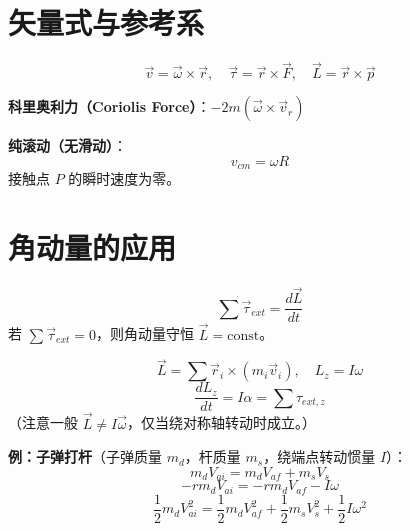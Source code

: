 \documentclass{article}
\begin{document}
\section{矢量式与参考系}

\begin{equation}
\vec{v} = \vec{\omega} \times \vec{r}, \quad \vec{\tau} = \vec{r} \times \vec{F}, \quad \vec{L} = \vec{r} \times \vec{p}
\end{equation}

\textbf{科里奥利力（Coriolis Force）}：\( -2m (\vec{\omega} \times \vec{v}_r) \)

\textbf{纯滚动（无滑动）}：
\begin{equation}
v_{cm} = \omega R
\end{equation}
接触点 \( P \) 的瞬时速度为零。

\begin{center}
\end{center}

\section{角动量的应用}

\begin{equation}
\sum \vec{\tau}_{ext} = \frac{d\vec{L}}{dt}
\end{equation}
若 \( \sum \vec{\tau}_{ext} = 0 \)，则角动量守恒 \( \vec{L} = \text{const} \)。

\begin{equation}
\vec{L} = \sum \vec{r}_i \times (m_i \vec{v}_i), \quad L_z = I\omega
\end{equation}
\begin{equation}
\frac{dL_z}{dt} = I\alpha = \sum \tau_{ext,z}
\end{equation}
（注意一般 \( \vec{L} \neq I\vec{\omega} \)，仅当绕对称轴转动时成立。）

\textbf{例：子弹打杆}（子弹质量 \( m_d \)，杆质量 \( m_s \)，绕端点转动惯量 \( I \)）：
\begin{equation}
m_d V_{ai} = m_d V_{af} + m_s V_{s}
\end{equation}
\begin{equation}
-r m_d V_{ai} = -r m_d V_{af} - I\omega
\end{equation}
\begin{equation}
\frac{1}{2} m_d V_{ai}^2 = \frac{1}{2} m_d V_{af}^2 + \frac{1}{2} m_s V_s^2 + \frac{1}{2} I\omega^2
\end{equation}
\end{document}
